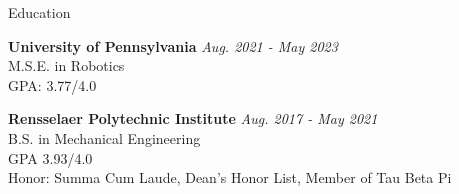 \documentclass{resume} %
\begin{document}

\begin{rSection}{Education}

{\bf University of Pennsylvania} \hfill {\em Aug. 2021 - May 2023
} \\ 
M.S.E. in Robotics \\
GPA: 3.77/4.0

{\bf Rensselaer Polytechnic Institute} \hfill {\em Aug. 2017 - May 2021
} \\ 
B.S. in Mechanical Engineering \\
GPA 3.93/4.0 \smallskip \\
Honor: Summa Cum Laude, Dean's Honor List, Member of Tau Beta Pi

\end{rSection}

\end{document}
